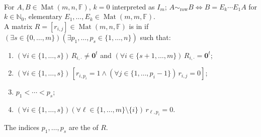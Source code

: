 \begin{definition} \label{def:row-equivalence-and-rref} \\
For $A,B\in\operatorname{Mat}(m,n,\mathbb{F})$, $k=0$ interpreted as $I_m$; $A\sim_{\mathrm{row}}B\Longleftrightarrow B=E_k\cdots E_1A$ for $k\in\mathbb{N}_0$, elementary $E_1,\ldots,E_k\in\operatorname{Mat}(m,m,\mathbb{F})$.\\
A matrix $R=[r_{i,j}]\in\operatorname{Mat}(m,n,\mathbb{F})$ is in  if $(\exists s\in\{0,\ldots,m\})(\exists p_1,\ldots,p_s\in\{1,\ldots,n\})$ such that:
\begin{enumerate}[label=(\roman*)]
\setlength{\itemsep}{0pt}
\item $(\forall i\in\{1,\ldots,s\})\,R_{i,\cdot}\neq\mathbf{0}^t$ and $(\forall i\in\{s+1,\ldots,m\})\,R_{i,\cdot}=\mathbf{0}^t$;
\item $(\forall i\in\{1,\ldots,s\})\,[r_{i,p_i}=1\land(\forall j\in\{1,\ldots,p_i-1\})\,r_{i,j}=0]$;
\item $p_1<\cdots<p_s$;
\item $(\forall i\in\{1,\ldots,s\})(\forall \ell\in\{1,\ldots,m\}\setminus\{i\})\,r_{\ell,p_i}=0$.
\end{enumerate}
The indices $p_1,\ldots,p_s$ are the  of $R$.
\end{definition}

